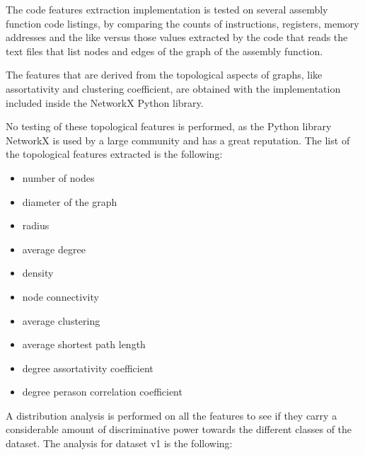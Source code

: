 \begin{appendices}
The code features extraction implementation is tested on several assembly function code listings, by comparing the counts of instructions, registers, memory addresses and the like versus those values extracted by the code that reads the text files that list nodes and edges of the graph of the assembly function.



The features that are derived from the topological aspects of graphs, like assortativity and clustering coefficient, are obtained with the implementation included inside the NetworkX Python library.

No testing of these topological features is performed, as the Python library NetworkX is used by a large community and has a great reputation. 
The list of the topological features extracted is the following:
\begin{itemize}
	\item number of nodes
	\item diameter of the graph
	\item radius
	\item average degree
	\item density
	\item node connectivity
	\item average clustering
	\item average shortest path length
	\item degree assortativity coefficient
	\item degree perason correlation coefficient
\end{itemize}


A distribution analysis is performed on all the features to see if they carry a considerable amount of discriminative power towards the different classes of the dataset. The analysis for dataset v1 is the following:


\end{appendices}
